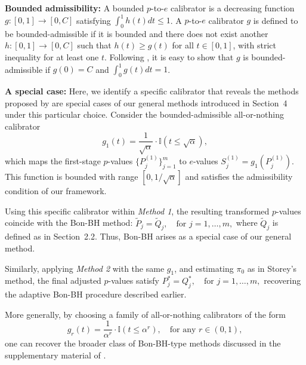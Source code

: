 \documentclass[11pt]{article}
\numberwithin{equation}{section}
\theoremstyle{plain}
\theoremstyle{remark}
\begin{document}
\textbf{Bounded admissibility:} A bounded $p$-to-$e$ calibrator is a decreasing function $g:[0,1]\to[0,C]$ satisfying $\int_0^1 h(t)dt\leq 1$. A $p$-to-$e$ calibrator $g$ is defined to be bounded-admissible if it is bounded and there does not exist another $h:[0,1]\to[0,C]$ such that $h(t)\geq g(t)$ for all $t\in [0,1]$, with strict inequality for at least one $t$. Following \citet{vovk2021evalues}, it is easy to show that $g$ is bounded-admissible if $g(0)=C$ and $\int_0^1 g(t) dt=1$.

\textbf{A special case:} Here, we identify a specific calibrator that reveals the methods proposed by \citet{sarkar2022adjusting} are special cases of our general methods introduced in Section~4 under this particular choice.
Consider the bounded-admissible all-or-nothing calibrator  
\[
g_1(t) = \frac{1}{\sqrt{\alpha}} \cdot \mathbb{I}(t \leq \sqrt{\alpha}),
\]
which maps the first-stage \(p\)-values \(\{P_j^{(1)}\}_{j=1}^m\) to \(e\)-values \(S_j^{(1)} = g_1(P_j^{(1)})\). This function is bounded with range \([0, 1/\sqrt{\alpha}]\) and satisfies the admissibility condition of our framework.

Using this specific calibrator within \textit{Method 1}, the resulting transformed \(p\)-values coincide with the Bon-BH method:
\(
\tilde{P}_j = \tilde{Q}_j, \quad \text{for } j = 1, \dots, m,
\)
where \(\tilde{Q}_j\) is defined as in Section~2.2. Thus, Bon-BH arises as a special case of our general method.

Similarly, applying \textit{Method 2} with the same \(g_1\), and estimating \(\pi_0\) as in Storey’s method, the final adjusted \(p\)-values satisfy
\(
P_j^* = Q_j^*, \quad \text{for } j = 1, \dots, m,
\)
recovering the adaptive Bon-BH procedure described earlier.

More generally, by choosing a family of all-or-nothing calibrators of the form  
\[
g_r(t) = \frac{1}{\alpha^r} \cdot \mathbb{I}(t \leq \alpha^r), \quad \text{for any } r \in (0,1),
\]
one can recover the broader class of Bon-BH-type methods discussed in the supplementary material of \citet{sarkar2022adjusting}.
\end{document}
